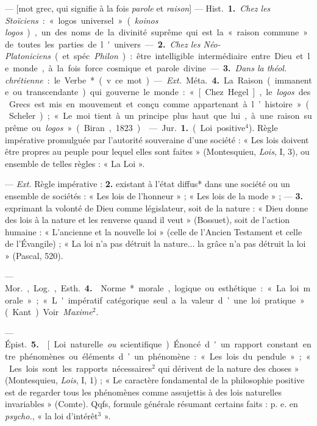 \begin{itemize}[leftmargin=1cm, label=, itemsep=1pt]
 — [mot grec, qui signifie à la fois {\it parole} et {\it raison}]
— \si{Hist.} {\bf 1.} {\it Chez les Stoïciens} : « logos universel »
({\it koinos logos}), un des noms de la
divinité suprême qui est la « raison commune » de toutes les parties de
l'univers. — {\bf 2.} {\it Chez les Néo-Platoniciens} (et spéc.
{\it Philon}) : être intelligible intermédiaire entre Dieu et le monde, à la
fois force cosmique et parole divine. — {\bf 3.} {\it Dans la théol.
chrétienne} : le Verbe* (v. ce mot).

— {\it Ext.} \si{Méta.} {\bf 4.} La Raison (immanente ou transcendante) qui
gouverne le monde : « [Chez Hegel], le {\it logos} des Grecs est mis en
mouvement et conçu comme appartenant à l’histoire » (Scheler) ; « Le moi
tient à un principe plus haut que lui, à une raison suprême ou
{\it logos} » (Biran, 1823).

 — \si{Jur.} {\bf 1.} (Loi positive$^4$). Règle impérative promulguée
par l'autorité souveraine d’une société : « Les lois doivent être propres au
peuple pour lequel elles sont faites » (Montesquieu, {\it Lois}, I, 3), ou
ensemble de telles règles : « La Loi ».

— {\it Ext.} Règle impérative : {\bf 2.} existant à l’état diffus* dans une
société ou un ensemble de sociétés : « Les lois de l'honneur » ; « Les lois
de la mode » ; — {\bf 3.} exprimant la volonté de Dieu comme législateur,
soit de la nature : « Dieu donne des lois à la nature et les renverse quand
il veut » (Bossuet), soit de l'action humaine : « L'ancienne et la nouvelle
loi » (celle de l'Ancien Testament et celle de l'Évangile) ; « La loi n'a pas
détruit la nature... la grâce n’a pas détruit la loi » (Pascal, 520).

— \si{Mor.}, \si{Log.}, \si{Esth.} {\bf 4.}  Norme* morale,
logique ou esthétique : « La loi morale » ; « L'impératif catégorique seul a
la valeur d’une loi pratique » (Kant). Voir {\it Maxime}$^2$.

— \si{Épist.} {\bf 5.}  [Loi naturelle {\it ou} scientifique).
Énoncé d'un rapport constant entre phénomènes ou éléments d’un phénomène :
« Les lois
du pendule » ; « Les lois sont les rapports nécessaires$^2$ qui dérivent de
la nature des choses » (Montesquieu, {\it Lois}, I, 1) ; « Le caractère
fondamental de la philosophie positive est de regarder tous les phénomènes
comme assujettis à des lois naturelles invariables » (Comte). Qqfs, formule
générale résumant certains faits : p. e. en {\it psycho.}, « la loi
d’intérêt$^3$ ».


\end{itemize}

